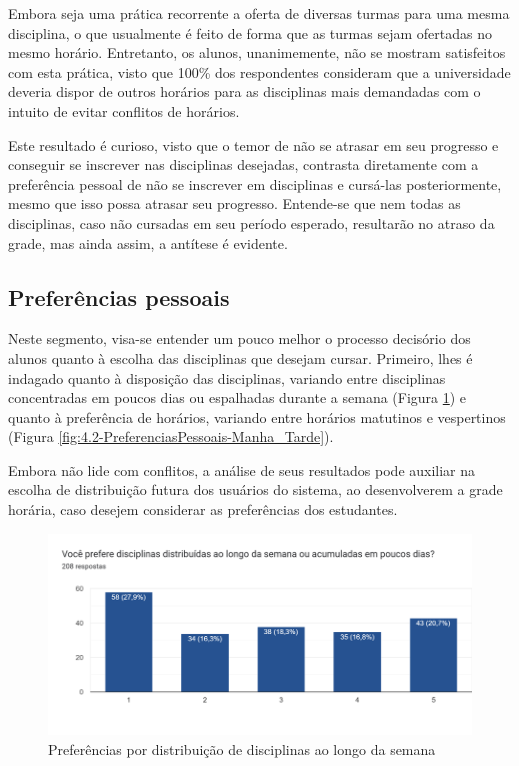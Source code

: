         Embora seja uma prática recorrente a oferta de diversas turmas para uma mesma disciplina, o que usualmente é feito de forma que as turmas sejam ofertadas no mesmo horário. Entretanto, os alunos, unanimemente, não se mostram satisfeitos com esta prática, visto que 100\% dos respondentes consideram que a universidade deveria dispor de outros horários para as disciplinas mais demandadas com o intuito de evitar conflitos de horários.

        Este resultado é curioso, visto que o temor de não se atrasar em seu progresso e conseguir se inscrever nas disciplinas desejadas, contrasta diretamente com a preferência pessoal de não se inscrever em disciplinas e cursá-las posteriormente, mesmo que isso possa atrasar seu progresso. Entende-se que nem todas as disciplinas, caso não cursadas em seu período esperado, resultarão no atraso da grade, mas ainda assim, a antítese é evidente.

    \subsection{Preferências pessoais} %

        Neste segmento, visa-se entender um pouco melhor o processo decisório dos alunos quanto à escolha das disciplinas que desejam cursar. Primeiro, lhes é indagado quanto à disposição das disciplinas, variando entre disciplinas concentradas em poucos dias ou espalhadas durante a semana (Figura \ref{fig:4.1-PreferenciasPessoais-Distribuida_Acumulada}) e quanto à preferência de horários, variando entre horários matutinos e vespertinos (Figura \ref{fig:4.2-PreferenciasPessoais-Manha_Tarde}).

        Embora não lide com conflitos, a análise de seus resultados pode auxiliar na escolha de distribuição futura dos usuários do sistema, ao desenvolverem a grade horária, caso desejem considerar as preferências dos estudantes.

        \begin{figure}[htbp]\centering
            \caption{\label{fig:4.1-PreferenciasPessoais-Distribuida_Acumulada}Preferências por distribuição de disciplinas ao longo da semana}
            \includegraphics[scale=0.6]{files/img/Forms/4.1-PreferenciasPessoais-Distribuida_Acumulada.png}
        \end{figure} %

